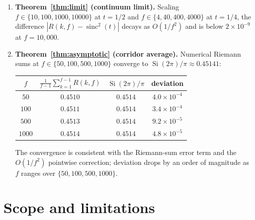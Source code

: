 \documentclass[11pt,reqno]{amsart}
\theoremstyle{plain}
\theoremstyle{definition}
\theoremstyle{remark}
\DeclareMathOperator{\sinc}{sinc}
\DeclareMathOperator{\Si}{Si}
\begin{document}
\begin{enumerate}[label={\upshape(\arabic*)}]
\item \textbf{Theorem~\ref{thm:limit} (continuum limit).} Scaling
$f \in \{10, 100, 1000, 10000\}$ at $t = 1/2$ and $f \in \{4, 40, 400,
4000\}$ at $t = 1/4$, the difference $|R(k, f) - \sinc^{2}(t)|$ decays
as $O(1/f^{2})$ and is below $2 \times 10^{-9}$ at $f = 10{,}000$.

\item \textbf{Theorem~\ref{thm:asymptotic} (corridor average).}
Numerical Riemann sums at $f \in \{50, 100, 500, 1000\}$ converge to
$\Si(2\pi)/\pi \approx 0.45141$:
\begin{center}
\begin{tabular}{c|c|c|c}
\toprule
$f$ & $\frac{1}{f-1}\sum_{k=1}^{f-1} R(k, f)$ & $\Si(2\pi)/\pi$ & deviation \\
\midrule
$50$   & $0.4510$ & $0.4514$ & $4.0 \times 10^{-4}$ \\
$100$  & $0.4511$ & $0.4514$ & $3.4 \times 10^{-4}$ \\
$500$  & $0.4513$ & $0.4514$ & $9.2 \times 10^{-5}$ \\
$1000$ & $0.4514$ & $0.4514$ & $4.8 \times 10^{-5}$ \\
\bottomrule
\end{tabular}
\end{center}
The convergence is consistent with the Riemann-sum error term and the
$O(1/f^{2})$ pointwise correction; deviation drops by an order of
magnitude as $f$ ranges over $\{50, 100, 500, 1000\}$.
\end{enumerate}

\section{Scope and limitations}\label{sec:scope}
\end{document}
